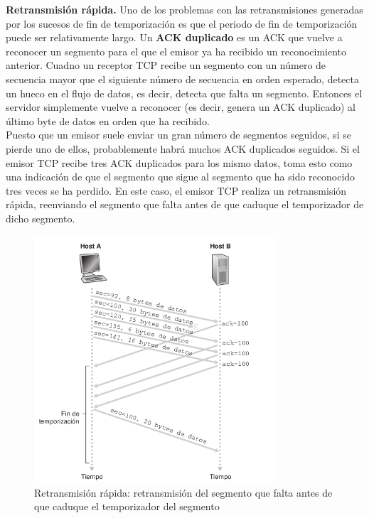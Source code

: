 \documentclass[a4paper,11pt]{article}
\begin{document}
\textbf{Retransmisión rápida.} Uno de los problemas con las retransmisiones generadas por los sucesos de fin de temporización es que el periodo de fin de temporización puede ser relativamente largo. Un \textbf{ACK duplicado} es un ACK que vuelve a reconocer un segmento para el que el emisor ya ha recibido un reconocimiento anterior. Cuadno un receptor TCP recibe un segmento con un número de secuencia mayor que el siguiente número de secuencia en orden esperado, detecta un hueco en el flujo de datos, es decir, detecta que falta un segmento. Entonces el servidor simplemente vuelve a reconocer (es decir, genera un ACK duplicado) al último byte de datos en orden que ha recibido. \\

Puesto que un emisor suele enviar un gran número de segmentos seguidos, si se pierde uno de ellos, probablemente habrá muchos ACK duplicados seguidos. Si el emisor TCP recibe tres ACK duplicados para los mismo datos, toma esto como una indicación de que el segmento que sigue al segmento que ha sido reconocido tres veces se ha perdido. En este caso, el emisor TCP realiza un retransmisión rápida, reenviando el segmento que falta antes de que caduque el temporizador de dicho segmento.

\begin{figure}
\centering
\caption{Retransmisión rápida: retransmisión del segmento que falta antes de que caduque el temporizador del segmento}
\includegraphics[scale=1,width=0.8\textwidth]{ejemplo_4.png}
\end{figure}
\end{document}
